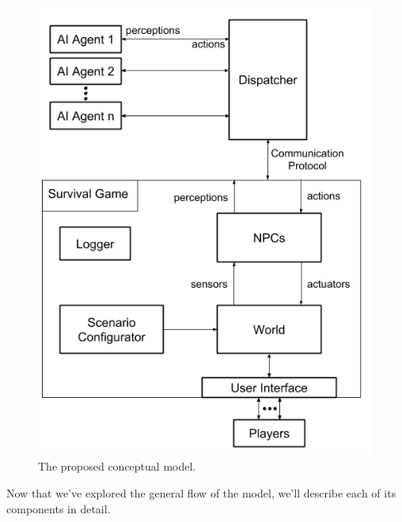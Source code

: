 \begin{figure}
  \centering
  \includegraphics[width=\textwidth]{./Images/model}
  \caption{The proposed conceptual model.}
  \label{fig:model}
\end{figure}

Now that we've explored the general flow of the model, we'll describe each of its components in detail.

